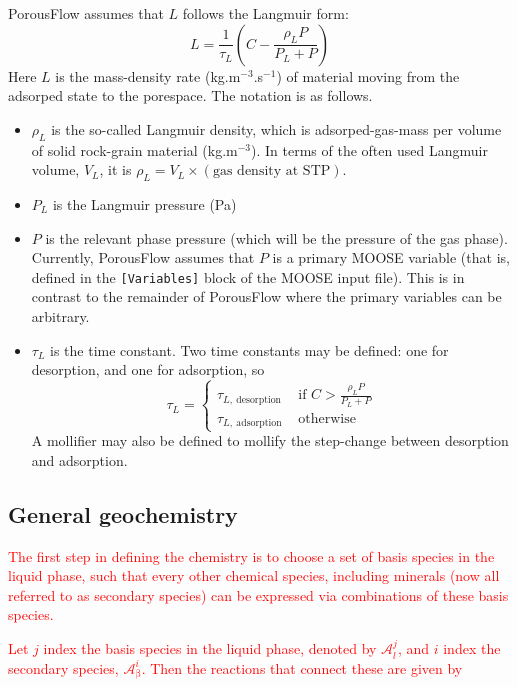 \documentclass[12pt]{report}
\def\phase{\mathrm{\beta}}
\begin{document}
PorousFlow assumes that $L$ follows the Langmuir form:
\begin{equation}
L = \frac{1}{\tau_{L}}\left(C - \frac{\rho_{L}P}{P_{L}+P} \right)
\end{equation}
Here $L$ is the mass-density rate (kg.m$^{-3}$.s$^{-1}$) of material
moving from the adsorped state to the porespace.  The notation is as
follows.
\begin{itemize}
\item $\rho_{L}$ is the so-called Langmuir density, which is
  adsorped-gas-mass per volume of solid rock-grain material (kg.m$^{-3}$).  In
  terms of the often used Langmuir volume, $V_{L}$, it is
  $\rho_{L}=V_{L}\times(\mbox{gas density at STP})$.
\item $P_{L}$ is the Langmuir pressure (Pa)
\item $P$ is the relevant phase pressure (which will be the pressure
  of the gas phase).  Currently, PorousFlow assumes that $P$ is a
  primary MOOSE variable (that is, defined in the {\tt [Variables]}
  block of the MOOSE input file).  This is in contrast to the
  remainder of PorousFlow where the primary variables can be
  arbitrary.
\item $\tau_{L}$ is the time constant.  Two time constants may be
  defined: one for desorption, and one for adsorption, so
\begin{equation}
\tau_{L} = \left\{
\begin{array}{ll}
\tau_{L,\ \mathrm{desorption}} & \mbox{ if }
C>\frac{\rho_{L}P}{P_{L}+P} \\
\tau_{L,\ \mathrm{adsorption}} & \mbox{ otherwise}
\end{array}
\right.
\end{equation}
A mollifier may also be defined to mollify the step-change between
desorption and adsorption.
\end{itemize}



\subsection{General geochemistry}
\label{geochem.sec}

\textcolor{red}{
The first step in defining the chemistry is to choose a set of basis
species  in the liquid phase, such that every other chemical species,
including minerals (now all referred to as secondary species) can be
expressed via combinations of these basis  species.}

\textcolor{red}{
Let $j$ index the basis species in the liquid phase, denoted by
$\mathcal{A}^{j}_{l}$, and $i$ index the secondary species,
$\mathcal{A}^{i}_{\phase}$. Then the reactions that connect these are
given by
}
\end{document}
